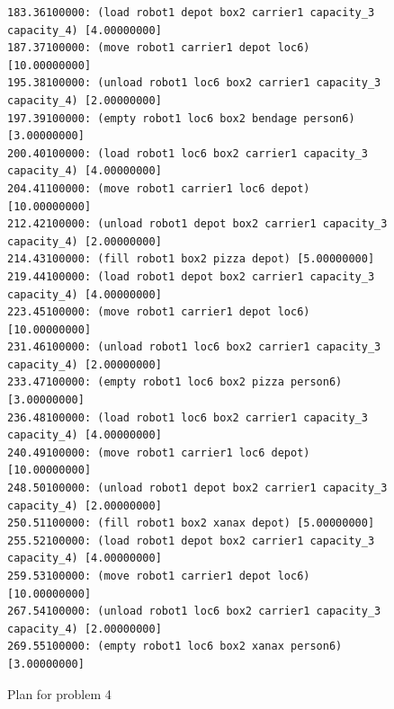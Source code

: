 \begin{figure}[h!]
\begin{verbatim}
183.36100000: (load robot1 depot box2 carrier1 capacity_3 capacity_4) [4.00000000]
187.37100000: (move robot1 carrier1 depot loc6) [10.00000000]
195.38100000: (unload robot1 loc6 box2 carrier1 capacity_3 capacity_4) [2.00000000]
197.39100000: (empty robot1 loc6 box2 bendage person6) [3.00000000]
200.40100000: (load robot1 loc6 box2 carrier1 capacity_3 capacity_4) [4.00000000]
204.41100000: (move robot1 carrier1 loc6 depot) [10.00000000]
212.42100000: (unload robot1 depot box2 carrier1 capacity_3 capacity_4) [2.00000000]
214.43100000: (fill robot1 box2 pizza depot) [5.00000000]
219.44100000: (load robot1 depot box2 carrier1 capacity_3 capacity_4) [4.00000000]
223.45100000: (move robot1 carrier1 depot loc6) [10.00000000]
231.46100000: (unload robot1 loc6 box2 carrier1 capacity_3 capacity_4) [2.00000000]
233.47100000: (empty robot1 loc6 box2 pizza person6) [3.00000000]
236.48100000: (load robot1 loc6 box2 carrier1 capacity_3 capacity_4) [4.00000000]
240.49100000: (move robot1 carrier1 loc6 depot) [10.00000000]
248.50100000: (unload robot1 depot box2 carrier1 capacity_3 capacity_4) [2.00000000]
250.51100000: (fill robot1 box2 xanax depot) [5.00000000]
255.52100000: (load robot1 depot box2 carrier1 capacity_3 capacity_4) [4.00000000]
259.53100000: (move robot1 carrier1 depot loc6) [10.00000000]
267.54100000: (unload robot1 loc6 box2 carrier1 capacity_3 capacity_4) [2.00000000]
269.55100000: (empty robot1 loc6 box2 xanax person6) [3.00000000]
    \end{verbatim}
    \caption{Plan for problem 4}
    \label{problem4_plan}
\end{figure}

